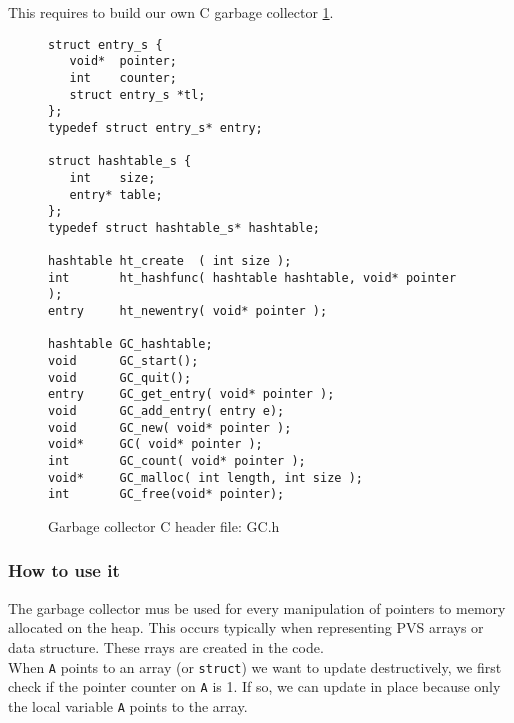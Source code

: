\documentclass[12pt,a4paper]{article}
\newcommand{\cl}[1]{\texttt{#1}}
\begin{document}
This requires to build our own C garbage collector \ref{fig:GC.h}.

\begin{figure}
\begin{lstlisting}
struct entry_s {
   void*  pointer;
   int    counter;
   struct entry_s *tl;
};
typedef struct entry_s* entry;

struct hashtable_s {
   int    size;
   entry* table;	
}; 
typedef struct hashtable_s* hashtable;

hashtable ht_create  ( int size );
int       ht_hashfunc( hashtable hashtable, void* pointer );
entry     ht_newentry( void* pointer );

hashtable GC_hashtable;
void      GC_start();
void      GC_quit();
entry     GC_get_entry( void* pointer );
void      GC_add_entry( entry e);
void      GC_new( void* pointer );
void*     GC( void* pointer );
int       GC_count( void* pointer );
void*     GC_malloc( int length, int size );
int       GC_free(void* pointer);
\end{lstlisting}
\caption{Garbage collector C header file: GC.h}
\label{fig:GC.h}
\end{figure}



\subsubsection{How to use it}

The garbage collector mus be used for every manipulation of pointers to memory allocated on the heap. This occurs typically when representing PVS arrays or data structure. These rrays are created in the code.\\

%


When \cl{A} points to an array (or \cl{struct}) we want to update destructively, we first check if the pointer counter on \cl{A} is 1. If so, we can update in place because only the local variable \cl{A} points to the array.\\
\end{document}
